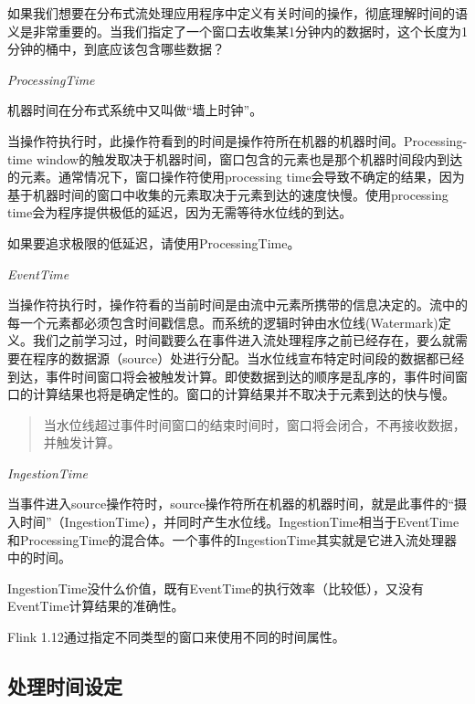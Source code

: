 \documentclass[cn,11pt,chinese]{elegantbook}
\begin{document}
如果我们想要在分布式流处理应用程序中定义有关时间的操作，彻底理解时间的语义是非常重要的。当我们指定了一个窗口去收集某1分钟内的数据时，这个长度为1分钟的桶中，到底应该包含哪些数据？

\textit{ProcessingTime}

\begin{note}
    机器时间在分布式系统中又叫做“墙上时钟”。
\end{note}

当操作符执行时，此操作符看到的时间是操作符所在机器的机器时间。Processing-time window的触发取决于机器时间，窗口包含的元素也是那个机器时间段内到达的元素。通常情况下，窗口操作符使用processing time会导致不确定的结果，因为基于机器时间的窗口中收集的元素取决于元素到达的速度快慢。使用processing time会为程序提供极低的延迟，因为无需等待水位线的到达。

\begin{note}
    如果要追求极限的低延迟，请使用ProcessingTime。
\end{note}

\textit{EventTime}

当操作符执行时，操作符看的当前时间是由流中元素所携带的信息决定的。流中的每一个元素都必须包含时间戳信息。而系统的逻辑时钟由水位线(Watermark)定义。我们之前学习过，时间戳要么在事件进入流处理程序之前已经存在，要么就需要在程序的数据源（source）处进行分配。当水位线宣布特定时间段的数据都已经到达，事件时间窗口将会被触发计算。即使数据到达的顺序是乱序的，事件时间窗口的计算结果也将是确定性的。窗口的计算结果并不取决于元素到达的快与慢。

\begin{quotation}
    当水位线超过事件时间窗口的结束时间时，窗口将会闭合，不再接收数据，并触发计算。
\end{quotation}

\textit{IngestionTime}

当事件进入source操作符时，source操作符所在机器的机器时间，就是此事件的“摄入时间”（IngestionTime），并同时产生水位线。IngestionTime相当于EventTime和ProcessingTime的混合体。一个事件的IngestionTime其实就是它进入流处理器中的时间。

\begin{note}
    IngestionTime没什么价值，既有EventTime的执行效率（比较低），又没有EventTime计算结果的准确性。
\end{note}

Flink 1.12通过指定不同类型的窗口来使用不同的时间属性。

\subsection{处理时间设定}
\end{document}
